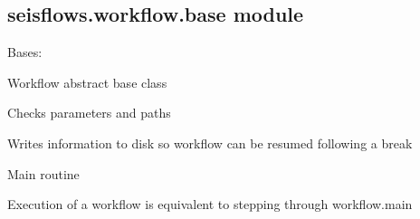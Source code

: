 \documentclass[letterpaper,10pt,english]{sphinxmanual}
\begin{document}
\subsection{seisflows.workflow.base module}
\label{\detokenize{ref/seisflows.workflow:module-seisflows.workflow.base}}\label{\detokenize{ref/seisflows.workflow:seisflows-workflow-base-module}}

\begin{fulllineitems}
\label{\detokenize{ref/seisflows.workflow:seisflows.workflow.base.base}}
Bases: 

Workflow abstract base class

\begin{fulllineitems}
\label{\detokenize{ref/seisflows.workflow:seisflows.workflow.base.base.check}}
Checks parameters and paths

\end{fulllineitems}


\begin{fulllineitems}
\label{\detokenize{ref/seisflows.workflow:seisflows.workflow.base.base.checkpoint}}
Writes information to disk so workflow can be resumed following a
break

\end{fulllineitems}


\begin{fulllineitems}
\label{\detokenize{ref/seisflows.workflow:seisflows.workflow.base.base.main}}
Main routine

Execution of a workflow is equivalent to stepping through
workflow.main

\end{fulllineitems}


\end{fulllineitems}
\end{document}
